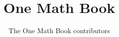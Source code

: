 \documentclass[11pt,a4paper,twoside,openany]{book}
\title{One Math Book}
\author{The One Math Book contributors}
\date{\bookdate}
\begin{document}
\frontmatter



\tableofcontents

\mainmatter





\appendix
\part{\omsolutionspart}




\backmatter
\printindex
\end{document}
